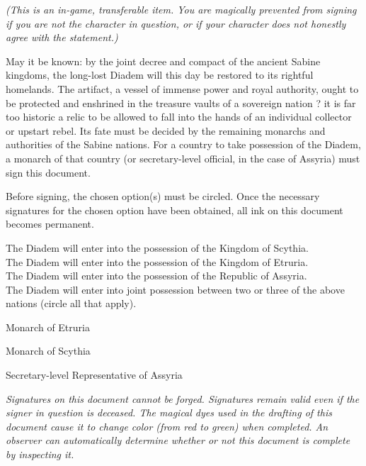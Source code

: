 \documentclass[white]{Kos}
\begin{document}
\name{\wDiademContract{}}

\emph{(This is an in-game, transferable item. You are magically prevented from signing if you are not the character in question, or if your character does not honestly agree with the statement.)}

May it be known: by the joint decree and compact of the ancient Sabine kingdoms, the long-lost Diadem will this day be restored to its rightful homelands. The artifact, a vessel of immense power and royal authority, ought to be protected and enshrined in the treasure vaults of a sovereign nation ? it is far too historic a relic to be allowed to fall into the hands of an individual collector or upstart rebel. Its fate must be decided by the remaining monarchs and authorities of the Sabine nations. For a country to take possession of the Diadem, a monarch of that country (or secretary-level official, in the case of Assyria) must sign this document.

Before signing, the chosen option(s) must be circled. Once the necessary signatures for the chosen option have been obtained, all ink on this document becomes permanent.

The Diadem will enter into the possession of the Kingdom of Scythia.\\
The Diadem will enter into the possession of the Kingdom of Etruria.\\
The Diadem will enter into the possession of the Republic of Assyria.\\
The Diadem will enter into joint possession between two or three of the above nations (circle all that apply).\\

\hrulefill

Monarch of Etruria

\hrulefill

Monarch of Scythia

\hrulefill

Secretary-level Representative of Assyria

\emph{Signatures on this document cannot be forged. Signatures remain valid even if the signer in question is deceased. The magical dyes used in the drafting of this document cause it to change color (from red to green) when completed. An observer can automatically determine whether or not this document is complete by inspecting it.}
\end{document}
